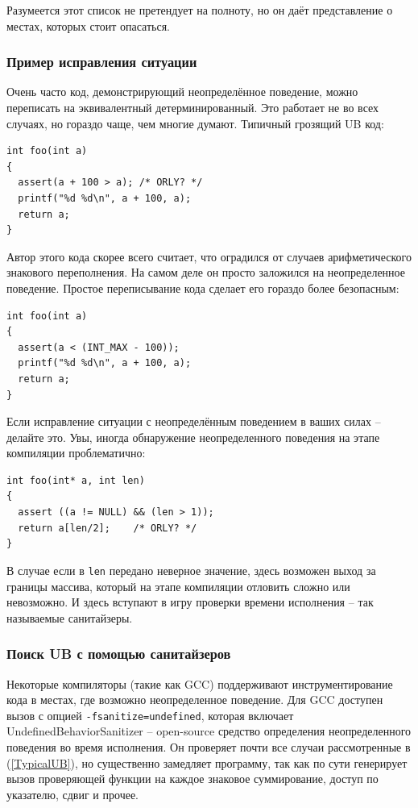 \documentclass[a4paper,12pt,oneside]{article}
\begin{document}
Разумеется этот список не претендует на полноту, но он даёт представление о местах, которых стоит опасаться.

\subsubsection{Пример исправления ситуации}\label{CorrectingUB}

Очень часто код, демонстрирующий неопределённое поведение, можно переписать на эквивалентный детерминированный. Это работает не во всех случаях, но гораздо чаще, чем многие думают. Типичный грозящий UB код:

\begin{lstlisting}
int foo(int a) 
{
  assert(a + 100 > a); /* ORLY? */
  printf("%d %d\n", a + 100, a);
  return a;
}
\end{lstlisting}

Автор этого кода скорее всего считает, что оградился от случаев арифметического знакового переполнения. На самом деле он просто заложился на неопределенное поведение. Простое переписывание кода сделает его гораздо более безопасным:

\begin{lstlisting}
int foo(int a) 
{
  assert(a < (INT_MAX - 100));
  printf("%d %d\n", a + 100, a);
  return a;
}
\end{lstlisting}

Если исправление ситуации с неопределённым поведением в ваших силах -- делайте это. Увы, иногда обнаружение неопределенного поведения на этапе компиляции проблематично:

\begin{lstlisting}
int foo(int* a, int len) 
{
  assert ((a != NULL) && (len > 1));
  return a[len/2];    /* ORLY? */
}
\end{lstlisting}

В случае если в \lstinline!len! передано неверное значение, здесь возможен выход за границы массива, который на этапе компиляции отловить сложно или невозможно. И здесь вступают в игру проверки времени исполнения -- так называемые санитайзеры.

\subsubsection{Поиск UB с помощью санитайзеров}\label{SanitizerUsage}

Некоторые компиляторы (такие как GCC) поддерживают инструментирование кода в местах, где возможно неопределенное поведение. Для GCC доступен вызов с опцией \lstinline!-fsanitize=undefined!, которая включает UndefinedBehaviorSanitizer -- open-source средство определения неопределенного поведения во время исполнения. Он проверяет почти все случаи рассмотренные в (\ref{TypicalUB}), но существенно замедляет программу, так как по сути генерирует вызов проверяющей функции на каждое знаковое суммирование, доступ по указателю, сдвиг и прочее.
\end{document}
